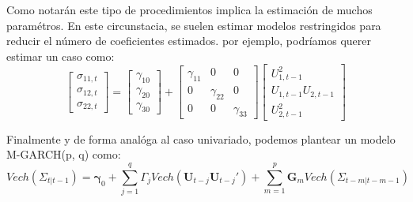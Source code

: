 \documentclass[
  a4paper,
]{article}
\begin{document}
Como notarán este tipo de procedimientos implica la estimación de muchos
paramétros. En este circunstacia, se suelen estimar modelos restringidos
para reducir el número de coeficientes estimados. por ejemplo, podríamos
querer estimar un caso como: \begin{equation*}
    \begin{bmatrix}
    \sigma_{11, t} \\ \sigma_{12, t} \\ \sigma_{22, t}
    \end{bmatrix} =
    \begin{bmatrix}
    \gamma_{10} \\ \gamma_{20} \\ \gamma_{30}
    \end{bmatrix} +
    \begin{bmatrix}
    \gamma_{11} & 0 & 0 \\ 0 & \gamma_{22} & 0 \\ 0 & 0 & \gamma_{33}
    \end{bmatrix} 
    \begin{bmatrix}
    U^2_{1, t-1} \\ U_{1, t-1} U_{2, t-1} \\ U^2_{2, t-1}
    \end{bmatrix}
\end{equation*}

Finalmente y de forma analóga al caso univariado, podemos plantear un
modelo M-GARCH(p, q) como: \[
    Vech(\Sigma_{t | t-1}) = \boldsymbol{\gamma}_0 + \sum_{j = 1}^q \Gamma_j Vech(\mathbf{U}_{t-j} \mathbf{U}_{t-j}') + \sum_{m = 1}^p \mathbf{G}_m Vech(\Sigma_{t-m | t-m-1})
    \label{M_GARCH}
\]
\end{document}
